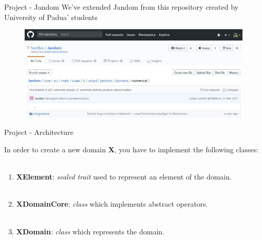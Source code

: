 \documentclass{beamer}
\begin{document}
	\begin{frame}{Project - Jandom}
		We've extended Jandom from this repository created by University of Padua' students
		\begin{figure}[c]
			\includegraphics[scale=0.4]{images/repo.jpg}
		\end{figure}
	\end{frame}

	\begin{frame}{Project - Architecture}
	
	In order to create a new domain \textbf{X}, you have to implement the following classes:\\~\\
	\begin{enumerate}
		\item  \textbf{XElement}: \textit{sealed trait} used to represent an element of the domain. \\~\\
		\item \textbf{XDomainCore}: \textit{class} which implements abstract operators. \\~\\
		\item \textbf{XDomain}: \textit{class} which represents the domain.
	\end{enumerate}
	
	
	
\end{frame}
\end{document}
